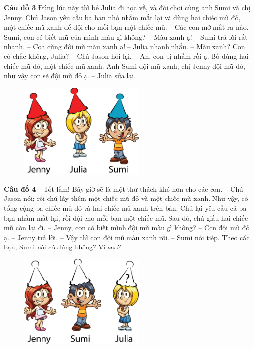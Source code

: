 	\textbf{Câu đố 3}
	\vskip 0.1cm
	Đúng lúc này thì bé Julia đi học về, và đòi chơi cùng anh Sumi và chị Jenny. Chú Jason yêu cầu ba bạn nhỏ nhắm mắt lại và dùng hai chiếc mũ đỏ, một chiếc mũ xanh để đội cho mỗi bạn một chiếc mũ.
	\vskip 0.1cm
	-- Các con mở mắt ra nào. Sumi, con có biết mũ của mình màu gì không?
	\vskip 0.1cm
	-- Màu xanh ạ! -- Sumi trả lời rất nhanh.
	\vskip 0.1cm
	-- Con cũng đội mũ màu xanh ạ! -- Julia  nhanh nhẩu.
	\vskip 0.1cm
	-- Màu xanh? Con có chắc không, Julia? -- Chú Jason hỏi lại.
	\vskip 0.1cm
	-- Ah, con bị nhầm rồi ạ. Bố dùng hai chiếc mũ đỏ, một chiếc mũ xanh. Anh Sumi đội mũ xanh, chị Jenny đội mũ đỏ, như vậy con sẽ đội mũ đỏ ạ. – Julia sửa lại.
	\begin{figure}[H]
	\centering
	\vspace*{-5pt}
	\captionsetup{labelformat= empty, justification=centering}
	\includegraphics[width=0.55\textwidth]{h3}
	\vspace*{-10pt}
	\end{figure}
	
	\textbf{Câu đố 4}
	\vskip 0.1cm
	-- Tốt lắm! Bây giờ sẽ là một thử thách khó hơn cho các con. -- Chú Jason nói; rồi chú lấy thêm một chiếc mũ đỏ và một chiếc mũ xanh. Như vậy, có tổng cộng ba chiếc mũ đỏ và hai chiếc mũ xanh trên bàn. Chú lại yêu cầu cả ba bạn nhắm mắt lại, rồi đội cho mỗi bạn một chiếc mũ. Sau đó, chú giấu hai chiếc mũ còn lại đi.
	\vskip 0.1cm
	-- Jenny, con có biết mình đội mũ màu gì không?
	\vskip 0.1cm
	-- Con đội mũ đỏ ạ. -- Jenny trả lời.
	\vskip 0.1cm
	-- Vậy thì con đội mũ màu xanh rồi. -- Sumi  nói tiếp.
	\vskip 0.1cm
	Theo các bạn, Sumi nói có đúng không? Vì sao?
	\begin{figure}[H]
		\centering
		\vspace*{-5pt}
		\captionsetup{labelformat= empty, justification=centering}
		\includegraphics[width=0.55\textwidth]{h5}
		\vspace*{-10pt}
	\end{figure}
	
